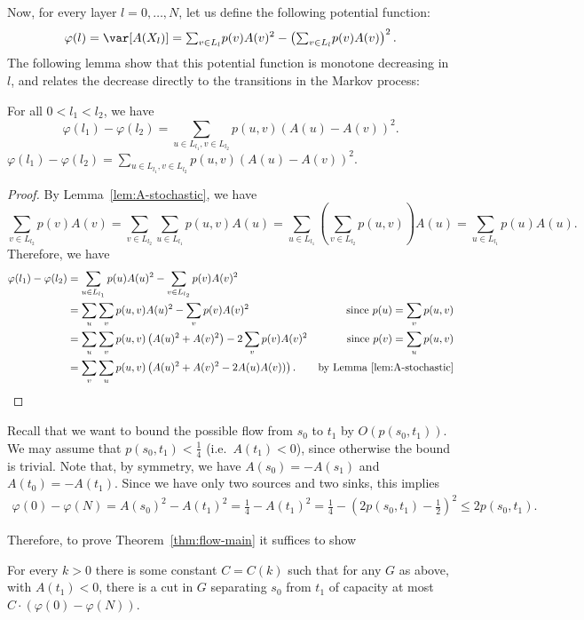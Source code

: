 Now, for every layer $l=0,\ldots, N$, let us define the following potential function:
$$\varphi(l)=\var[A(X_l)]={\textstyle\sum}_{v\in L_l}p(v)A(v)^2-\left({\textstyle\sum}_{v\in L_l}p(v)A(v)\right)^2.$$
The following lemma show that this potential function is monotone decreasing in $l$, and relates the decrease directly to the transitions in the Markov process:

\begin{lemma}\label{lem:potential} For all $0<l_1<l_2$, we have
\ifprocs $$\varphi(l_1)-\varphi(l_2)=\displaystyle\sum_{u\in L_{l_1},v\in L_{l_2}}p(u,v)(A(u)-A(v))^2.$$
\else $\varphi(l_1)-\varphi(l_2)=\displaystyle\sum_{u\in L_{l_1},v\in L_{l_2}}p(u,v)(A(u)-A(v))^2.$
\fi
\end{lemma}
\ifprocs\else
\begin{proof}
By Lemma~\ref{lem:A-stochastic}, we have $$\sum_{v\in L_{l_2}}p(v)A(v)=\sum_{v\in L_{l_2}}\sum_{u\in L_{l_1}}p(u,v)A(u)=\sum_{u\in L_{l_1}}(\sum_{v\in L_{l_2}}p(u,v))A(u)=\sum_{u\in L_{l_1}}p(u)A(u).$$
Therefore, we have
\begin{align*}
\varphi(l_1)-\varphi(l_2)&=\sum_{u\in L_{l_1}}p(u)A(u)^2-\sum_{v\in L_{l_2}}p(v)A(v)^2\\
&=\sum_{u}\sum_{v}p(u,v)A(u)^2-\sum_{v}p(v)A(v)^2&\text{since }p(u)=\sum_vp(u,v)\\
&=\sum_{u}\sum_{v}p(u,v)\left(A(u)^2+A(v)^2\right)-2\sum_{v}p(v)A(v)^2&\text{since }p(v)=\sum_up(u,v)\\
&=\sum_{v}\sum_{u}p(u,v)\left(A(u)^2+A(v)^2-2A(u)A(v))\right).&\text{by Lemma~\ref{lem:A-stochastic}}
\end{align*}
\end{proof}
\fi

Recall that we want to bound the possible flow from $s_0$ to $t_1$ by $O(p(s_0,t_1))$.  We may assume that  $p(s_0,t_1)<\frac14$ (i.e.\ $A(t_1)<0$), since otherwise the bound is trivial. Note that, by symmetry, we have $A(s_0)=-A(s_1)$ and $A(t_0)=-A(t_1)$. Since we have only two sources and two sinks, this implies
\begin{align*}\varphi(0)-\varphi(N)=A(s_0)^2-A(t_1)^2={\textstyle\frac14}-A(t_1)^2={\textstyle\frac14}-(2p(s_0,t_1)-{\textstyle\frac12})^2\leq2p(s_0,t_1).
\end{align*}

Therefore, to prove Theorem~\ref{thm:flow-main} it suffices to show
\begin{lemma}\label{lem:flow-main} For every $k>0$ there is some constant $C=C(k)$ such that for any $G$ as above, with $A(t_1)<0$, there is a cut in $G$ separating $s_0$ from $t_1$ of capacity at most $C\cdot(\varphi(0)-\varphi(N))$.
\end{lemma}

